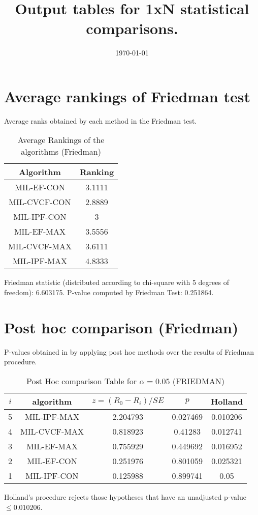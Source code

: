 \documentclass[a4paper,10pt]{article}
\title{Output tables for 1xN statistical comparisons.}
\author{}
\date{\today}
\begin{document}
\begin{landscape}
\pagestyle{empty}
\maketitle
\thispagestyle{empty}

\section{Average rankings of Friedman test}


Average ranks obtained by each method in the Friedman test.

\begin{table}[!htp]
\centering
\begin{tabular}{|c|c|}\hline
Algorithm&Ranking\\\hline
MIL-EF-CON&3.1111\\MIL-CVCF-CON&2.8889\\MIL-IPF-CON&3\\MIL-EF-MAX&3.5556\\MIL-CVCF-MAX&3.6111\\MIL-IPF-MAX&4.8333\\\hline\end{tabular}
\caption{Average Rankings of the algorithms (Friedman)}
\end{table}

Friedman statistic (distributed according to chi-square with 5 degrees of freedom): 6.603175. \newline P-value computed by Friedman Test: 0.251864.\newline


\newpage

\section{Post hoc comparison (Friedman)}


P-values obtained in by applying post hoc methods over the results of Friedman procedure.

\begin{table}[!htp]
\centering\footnotesize
\begin{tabular}{ccccc}
$i$&algorithm&$z=(R_0 - R_i)/SE$&$p$&Holland\\
\hline5&MIL-IPF-MAX&2.204793&0.027469&0.010206\\4&MIL-CVCF-MAX&0.818923&0.41283&0.012741\\3&MIL-EF-MAX&0.755929&0.449692&0.016952\\2&MIL-EF-CON&0.251976&0.801059&0.025321\\1&MIL-IPF-CON&0.125988&0.899741&0.05\\\hline
\end{tabular}
\caption{Post Hoc comparison Table for $\alpha=0.05$ (FRIEDMAN)}
\end{table}Holland's procedure rejects those hypotheses that have an unadjusted p-value $\le0.010206$.



\end{landscape}
\end{document}
